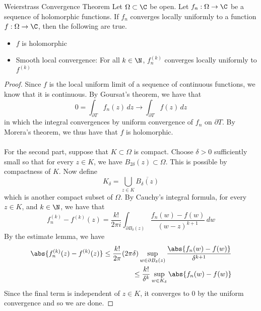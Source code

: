 \documentclass[a4paper]{article}
\begin{document}
\begin{thm}{Weierstrass Convergence Theorem}{} Let $\Omega\subset\C$ be open. Let $f_n:\Omega\to\C$ be a sequence of holomorphic functions. If $f_n$ converges locally uniformly to a function $f:\Omega\to\C$, then the following are true. 
\begin{itemize}
\item $f$ is holomorphic
\item Smooth local convergence: For all $k\in\N$, $f_n^{(k)}$ converges locally uniformly to $f^{(k)}$
\end{itemize} \tcbline
\begin{proof}
Since $f$ is the local uniform limit of a sequence of continuous functions, we know that it is continuous. By Goursat's theorem, we have that $$0=\int_{\partial T}f_n(z)\,dz\to\int_{\partial T}f(z)\,dz$$ in which the integral convergences by uniform convergence of $f_n$ on $\partial T$. By Morera's theorem, we thus have that $f$ is holomorphic. \\~\\

For the second part, suppose that $K\subset\Omega$ is compact. Choose $\delta>0$ sufficiently small so that for every $z\in K$, we have $B_{2\delta}(z)\subset\Omega$. This is possible by compactness of $K$. Now define $$K_\delta=\bigcup_{z\in K}\overline{B_\delta(z)}$$ which is another compact subset of $\Omega$. By Cauchy's integral formula, for every $z\in K$, and $k\in\N$, we have that $$f_n^{(k)}-f^{(k)}(z)=\frac{k!}{2\pi i}\int_{\partial B_\delta(z)}\frac{f_n(w)-f(w)}{(w-z)^{k+1}}\,dw$$ By the estimate lemma, we have 
\begin{align*}
\abs{f_n^{(k)}(z)-f^{(k)}(z)}\leq\frac{k!}{2\pi}(2\pi\delta)\sup_{w\in\partial B_\delta(z)}\frac{\abs{f_n(w)-f(w)}}{\delta^{k+1}}\\
\leq\frac{k!}{\delta^k}\sup_{w\in K_\delta}\abs{f_n(w)-f(w)}
\end{align*}
Since the final term is independent of $z\in K$, it converges to $0$ by the uniform convergence and so we are done. 
\end{proof}
\end{thm}
\end{document}
